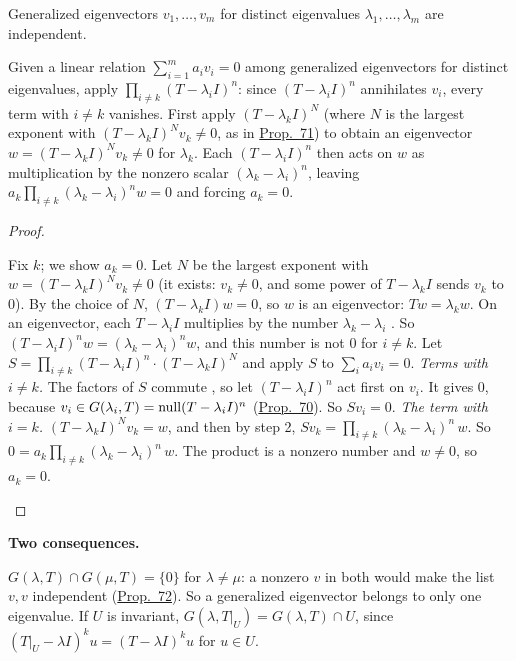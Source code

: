 \documentclass[10pt]{scrartcl}
\begin{document}
\begin{proposition*}\hypertarget{prop-72}{}\label{prop-72}
  Generalized eigenvectors $v_1,\dots,v_m$ for distinct eigenvalues $\lambda_1,\dots,\lambda_m$ are independent.
\end{proposition*}
\begin{ideabox}
Given a linear relation $\sum_{i=1}^m a_iv_i=0$ among generalized eigenvectors for distinct eigenvalues, apply $\prod_{i\ne k}(T-\lambda_iI)^n$: since $(T-\lambda_iI)^n$ annihilates $v_i$, every term with $i\ne k$ vanishes. First apply $(T-\lambda_kI)^N$ (where $N$ is the largest exponent with $(T-\lambda_kI)^Nv_k\ne 0$, as in \hyperref[prop-71]{Prop.~71}) to obtain an eigenvector $w=(T-\lambda_kI)^Nv_k\ne 0$ for $\lambda_k$. Each $(T-\lambda_iI)^n$ then acts on $w$ as multiplication by the nonzero scalar $(\lambda_k-\lambda_i)^n$, leaving $a_k\prod_{i\ne k}(\lambda_k-\lambda_i)^n w=0$ and forcing $a_k=0$.
\end{ideabox}
\begin{proof}
  \begin{steps}
    \ii Fix $k$; we show $a_k=0$. Let $N$ be the largest exponent with $w=(T-\lambda_kI)^Nv_k\ne0$ (it exists: $v_k\ne0$, and some power of $T-\lambda_kI$ sends $v_k$ to $0$). By the choice of $N$, $(T-\lambda_kI)w=0$, so $w$ is an eigenvector: $Tw=\lambda_kw$.
    \ii On an eigenvector, each $T-\lambda_iI$ multiplies by the number $\lambda_k-\lambda_i$ . So $(T-\lambda_iI)^nw=(\lambda_k-\lambda_i)^nw$, and this number is not $0$ for $i\ne k$.
    \ii Let $S=\prod_{i\ne k}(T-\lambda_iI)^n\cdot(T-\lambda_kI)^N$ and apply $S$ to $\sum_ia_iv_i=0$.
    \ii \emph{Terms with $i\ne k$.} The factors of $S$ commute , so let $(T-\lambda_iI)^n$ act first on $v_i$. It gives $0$, because $v_i\in G(\lambda_i,T)=\operatorname{null}(T-\lambda_iI)^n$ (\hyperref[prop-70]{Prop.~70}). So $Sv_i=0$.
    \ii \emph{The term with $i=k$.} $(T-\lambda_kI)^Nv_k=w$, and then by step 2, $Sv_k=\prod_{i\ne k}(\lambda_k-\lambda_i)^n\,w$.
    \ii So $0=a_k\prod_{i\ne k}(\lambda_k-\lambda_i)^n\,w$. The product is a nonzero number and $w\ne0$, so $a_k=0$.
  \end{steps}
\end{proof}

\textbf{Two consequences.}
\begin{itemize}
  \ii $G(\lambda,T)\cap G(\mu,T)=\{0\}$ for $\lambda\ne\mu$: a nonzero $v$ in both would make the list $v,v$ independent (\hyperref[prop-72]{Prop.~72}). So a generalized eigenvector belongs to only one eigenvalue.
  \ii If $U$ is invariant, $G(\lambda,T|_U)=G(\lambda,T)\cap U$, since $(T|_U-\lambda I)^ku=(T-\lambda I)^ku$ for $u\in U$.
\end{itemize}
\end{document}
